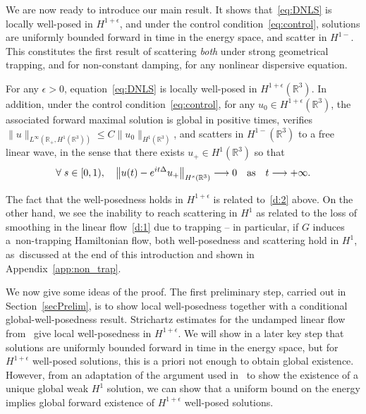 \documentclass[AHL,Unicode,longabstracts,published]{cedram}
\newcommand*\R{\mathbb{R}}
\newcounter{setofstep}
\newcounter{step}[setofstep]
\renewcommand*{\to}{\mathchoice{\longrightarrow}{\rightarrow}{\rightarrow}{\rightarrow}}
\let\oldforall\forall
\renewcommand*{\forall}{\mathrel{\oldforall}}
\begin{document}
We are now ready to introduce our main result. It shows that~\eqref{eq:DNLS} is locally well-posed in $H^{1+\epsilon}$, and under the control condition~\eqref{eq:control}, solutions are uniformly bounded forward in time in the energy space, and scatter in $H^{1-}$. This constitutes the first result of scattering \emph{both} under strong geometrical trapping, and for non-constant damping, for any nonlinear dispersive equation.
\begin{theo}\label{thm:ScatDef}
For any $\epsilon>0$, equation~\eqref{eq:DNLS} is locally well-posed in $H^{1+\epsilon}(\R^3)$. In addition, under the control condition~\eqref{eq:control}, for any $u_0 \in H^{1+\epsilon}(\R^3)$, the associated forward maximal solution is global in positive times, verifies $\| u \|_{L^\infty(\R_+, H^1(\R^3))} \leq C \| u_0 \|_{H^1(\R^3)}$, and scatters in $H^{1-}(\R^3)$ to a free linear wave, in the sense that there exists $u_+ \in H^{1}(\R^3)$ so that
\[
\forall s\in[0, 1), \quad\left\| u(t) - e^{it\Delta} u_+ \right\|_{H^{s}(\R^3)} \to 0 \quad \text{as} \quad t \to + \infty.
\]
\end{theo}

The fact that the well-posedness holds in $H^{1+\epsilon}$ is related to~\eqref{d:2} above. On the other hand, we see the inability to reach scattering in $H^1$ as related to the loss of smoothing in the linear flow~\eqref{d:1} due to trapping -- in particular, if $G$ induces a~non-trapping Hamiltonian flow, both well-posedness and scattering hold in $H^1$, as~discussed at the end of this introduction and shown in Appendix~\ref{app:non_trap}.

We now give some ideas of the proof. The first preliminary step, carried out in Section~\ref{secPrelim}, is to show local well-posedness together with a conditional global-well-posedness result. Strichartz estimates for the undamped linear flow from~\cite{BuGeTz04} give local well-posedness in $H^{1+\epsilon}$. We will show in a later key step that solutions are uniformly bounded forward in time in the energy space, but for $H^{1+\epsilon}$ well-posed solutions, this is a priori not enough to obtain global existence. However, from an adaptation of the argument used in~\cite{BuGeTz04} to show the existence of a unique global weak $H^1$ solution, we can show that a uniform bound on the energy implies global forward existence of $H^{1+\epsilon}$ well-posed solutions.
\end{document}
